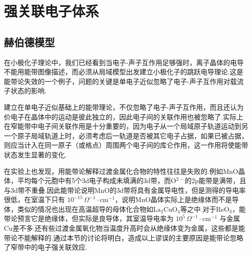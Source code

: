 \chapter{强关联电子体系}

\section{赫伯德模型}

在小极化子理论中，我们已经看到当电子-声子互作用足够强时，离子晶体的电导不能用能带图像描述，而必须从局域模型出发建立小极化子的跳跃电导理论.这是能带论失效的一个例子，问题的关键是单电子近似忽略了电子-声子互作用对载流子状态的影响.

建立在单电子近似基础上的能带理论，不仅忽略了电子-声子互作用，而且还认为价电子在晶体中的运动是彼此独立的，因此电子间的关联作用也被忽略了.实际上在窄能带中电子间关联作用是十分重要的，因为电子从一个局域原子轨道运动到另一个原子局域轨道上时，必须考虑后一轨道是否被其它电子占据，如果已被占据，则应当计入在同一原子（或格点）周围两个电子间的库仑作用，这一作用将使能带状态发生显著的变化.

在实验上也发现，用能带论解释过渡金属化合物的特性往往是失败的.例如MnO晶体，平均每个元胞中有5个3d电子构成未填满的3d带，而O$^{2-}$的2p能带是满带，且与3d带不重叠.因此能带论说明MnO的3d带将具有金属导电性，但是测得的导电率很低，在室温下只有 $10^{-15}\,\Omega^{-1}\cdot\mathrm{cm}^{-1}$，说明MnO晶体实际上是绝缘体而不是导体，类似的情况也出现在高温超导的母体化合物如La$_{2}$CuO$_{4}$等之中.对于ReO$_{3}$，能带论预言它是绝缘体，但实际是良导体，其室温导电率为 $10^{5}\,\Omega^{-1}\cdot\mathrm{cm}^{-1}$ 与金属Cu差不多.还有些过渡金属氧化物当温度升高时会从绝缘体变为金属，这些都是能带论不能解释的.通过本节的讨论将明白，造成以上谬误的主要原因是能带论忽略了窄带中的电子强关联效应.

